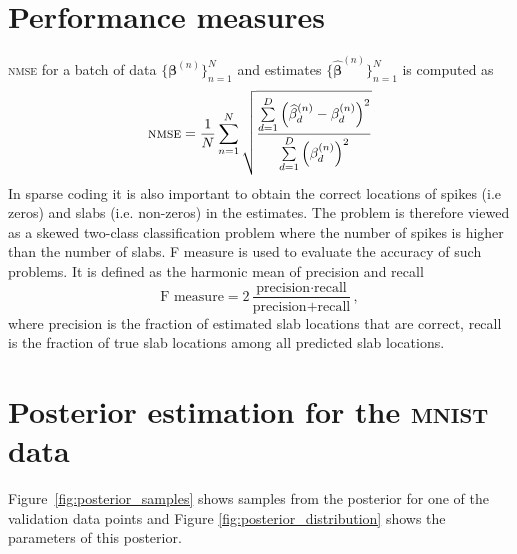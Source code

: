 \documentclass{article}
\begin{document}
\section{Performance measures}
\textsc{nmse} for a batch of data $\{\boldsymbol\beta^{(n)}\}_{n=1}^{N}$ and estimates $\{\widehat{\boldsymbol\beta}^{(n)}\}_{n=1}^{N}$ is computed as
\begin{equation}
\text{\textsc{nmse}} = \frac{1}{N}\sum\limits_{n=1}^N\sqrt{\frac{\sum\limits_{d=1}^D\left(\widehat{\beta}_{d}^{(n)} - \beta_d^{(n)}\right)^2}{\sum\limits_{d=1}^D\left(\beta_{d}^{(n)}\right)^2}}
\end{equation}
In sparse coding it is also important to obtain the correct locations of spikes (i.e zeros) and slabs (i.e. non-zeros) in the estimates. The problem is therefore viewed as a skewed two-class classification problem where the number of spikes is higher than the number of slabs. F measure is used to evaluate the accuracy of such problems. It is defined as the harmonic mean of precision and recall
\begin{equation}
\text{F measure} = 2\dfrac{\text{precision}\cdot\text{recall}}{\text{precision} + \text{recall}},
\end{equation}
where precision is the fraction of estimated slab locations that are correct, recall is the fraction of true slab locations among all predicted slab locations.

\section{Posterior estimation for the \textsc{mnist} data}
Figure~\ref{fig:posterior_samples} shows samples from the posterior for one of the validation data points and Figure \ref{fig:posterior_distribution} shows the parameters of this posterior.
\end{document}
